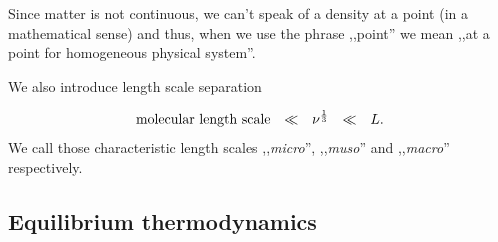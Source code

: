   Since matter is not continuous, we can't speak of a density at a point (in a mathematical sense) and
  thus, when we use the phrase ,,point'' we mean ,,at a point for homogeneous physical system''.

  We also introduce length scale separation %

  \begin{displaymath}
    \begin{matrix}
      \textrm{molecular length scale} & \ll & \nu^{\frac{1}{3}} & \ll & L.
    \end{matrix}
  \end{displaymath}
  We call those characteristic length scales ,,\emph{micro}'', ,,\emph{muso}'' and ,,\emph{macro}'' respectively.
  

  \subsection{Equilibrium thermodynamics}
